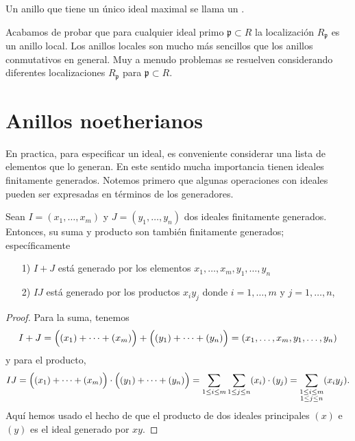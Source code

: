 \begin{definicion}
  Un anillo que tiene un único ideal maximal se llama un .
\end{definicion}

Acabamos de probar que para cualquier ideal primo $\mathfrak{p} \subset R$
la localización $R_\mathfrak{p}$ es un anillo local. Los anillos locales
son mucho más sencillos que los anillos conmutativos en general. Muy a menudo
problemas se resuelven considerando diferentes localizaciones $R_\mathfrak{p}$
para $\mathfrak{p} \subset R$.


\section{Anillos noetherianos}

En practica, para especificar un ideal, es conveniente considerar una lista
de elementos que lo generan. En este sentido mucha importancia tienen ideales
finitamente generados. Notemos primero que algunas operaciones con ideales
pueden ser expresadas en términos de los generadores.

\begin{observacion}
  Sean $I = (x_1,\ldots,x_m)$ y $J = (y_1,\ldots,y_n)$ dos ideales finitamente
  generados. Entonces, su suma y producto son también finitamente generados;
  específicamente

  \begin{enumerate}
  \item[1)] $I + J$ está generado por los elementos
    $x_1,\ldots,x_m,y_1,\ldots,y_n$

  \item[2)] $IJ$ está generado por los productos $x_i y_j$ donde
    $i = 1,\ldots,m$ y $j = 1,\ldots,n$,
  \end{enumerate}

  \begin{proof}
    Para la suma, tenemos
    \[ I + J =
       \Bigl((x_1) + \cdots + (x_m)\Bigr) + \Bigl((y_1) + \cdots + (y_n)\Bigr) =
       (x_1,\ldots,x_m,y_1,\ldots,y_n) \]
    y para el producto,
    \[ IJ =
       \Bigl((x_1) + \cdots + (x_m)\Bigr) \cdot \Bigl((y_1) + \cdots + (y_n)\Bigr) =
       \sum_{1 \le i \le m} \sum_{1 \le j \le n} (x_i)\cdot (y_j) =
       \sum_{\substack{ 1 \le i \le m \\ 1 \le j \le n}} (x_i y_j). \]
    Aquí hemos usado el hecho de que el producto de dos ideales principales
    $(x)$ e $(y)$ es el ideal generado por $xy$.
  \end{proof}
\end{observacion}

